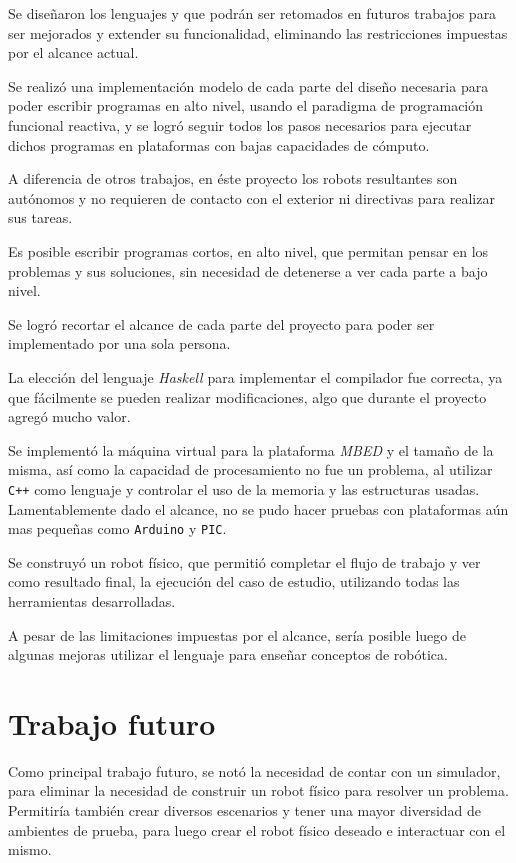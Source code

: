 
  Se diseñaron los lenguajes \frob{} y \alf{} que podrán ser
retomados en futuros trabajos para ser mejorados y extender
su funcionalidad, eliminando las restricciones impuestas
por el alcance actual.

  Se realizó una implementación modelo de cada parte del diseño
necesaria para poder escribir programas en alto nivel, usando
el paradigma de programación funcional reactiva, y se logró
seguir todos los pasos necesarios para ejecutar dichos programas
en plataformas con bajas capacidades de cómputo.

  A diferencia de otros trabajos, en éste proyecto los robots
resultantes son autónomos y no requieren de contacto con el
exterior ni directivas para realizar sus tareas.

  Es posible escribir programas cortos, en alto nivel, que permitan
pensar en los problemas y sus soluciones, sin necesidad de detenerse
a ver cada parte a bajo nivel.

  Se logró recortar el alcance de cada parte del proyecto para
poder ser implementado por una sola persona.

  La elección del lenguaje \textit{Haskell} para implementar el
compilador fue correcta, ya que fácilmente se pueden realizar
modificaciones, algo que durante el proyecto agregó mucho valor.

  Se implementó la máquina virtual para la plataforma \textit{MBED}
y el tamaño de la misma, así como la capacidad de procesamiento no
fue un problema, al utilizar \texttt{C++} como lenguaje y controlar
el uso de la memoria y las estructuras usadas.
  Lamentablemente dado el alcance, no se pudo hacer pruebas
con plataformas aún mas pequeñas como \texttt{Arduino} y \texttt{PIC}.

  Se construyó un robot físico, que permitió completar el flujo
de trabajo y ver como resultado final, la ejecución del caso de
estudio, utilizando todas las herramientas desarrolladas.

  A pesar de las limitaciones impuestas por el alcance, sería
posible luego de algunas mejoras utilizar el lenguaje para enseñar
conceptos de robótica.

\section{Trabajo futuro}

  Como principal trabajo futuro, se notó la necesidad de contar con
un simulador, para eliminar la necesidad de construir un robot físico
para resolver un problema. Permitiría también crear diversos escenarios
y tener una mayor diversidad de ambientes de prueba, para luego
crear el robot físico deseado e interactuar con el mismo.

